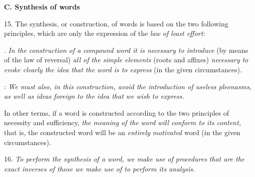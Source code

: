 {    \begin{center}
      \textbf{C. Synthesis of words}
    \end{center}

    15. The synthesis, or construction, of words is based on the two
    following principles, which are only the expression of the
    \emph{law of least effort}:

    . \emph{In the construction of a
      compound word it is necessary to introduce} (by means of the law
    of reversal) \emph{all of the simple elements } (roots and
    affixes) \emph{necessary to evoke clearly the idea that the word
      is to express} (in the given circumstances).

    : \emph{We must also, in this
      construction, avoid the introduction of useless pleonasms, as
      well as ideas foreign to the idea that we wish to express.}

    In other terms, if a word is constructed according to the two
    principles of necessity and sufficiency, \emph{the meaning of the
      word will conform to its content,} that is, the constructed word
    will be an \emph{entirely motivated} word (in the given
    circumstances).

    16. \emph{To perform the synthesis of a word, we make use of
      procedures that are the exact inverses of those we make use of
      to perform its analysis.}
  
  }

